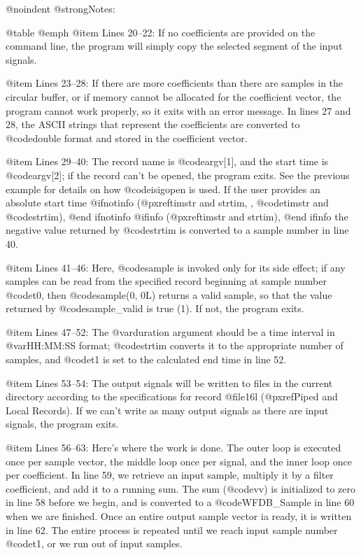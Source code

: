 {{{{{{{{{{{{{{@noindent
@strong{Notes:}

@table @emph
@item Lines 20--22:
If no coefficients are provided on the command line, the program will
simply copy the selected segment of the input signals.

@item Lines 23--28:
If there are more coefficients than there are samples in the circular
buffer, or if memory cannot be allocated for the coefficient vector, the
program cannot work properly, so it exits with an error message.  In
lines 27 and 28, the ASCII strings that represent the coefficients are
converted to @code{double} format and stored in the coefficient
vector.

@item Lines 29--40:
The record name is @code{argv[1]}, and the start time is @code{argv[2]};
if the record can't be opened, the program exits.  See the previous example
for details on how @code{isigopen} is used. If the user provides an absolute
start time
@ifnotinfo
(@pxref{timstr and strtim, , @code{timstr} and @code{strtim}}),
@end ifnotinfo
@ifinfo
(@pxref{timstr and strtim}),
@end ifinfo
the negative value returned by @code{strtim} is converted to a sample number
in line 40.

@item Lines 41--46:
Here, @code{sample} is invoked only for its side effect;  if any samples can
be read from the specified record beginning at sample number @code{t0}, then
@code{sample(0, 0L)} returns a valid sample, so that the value returned by
@code{sample_valid} is true (1).  If not, the program exits.

@item Lines 47--52:
The @var{duration} argument should be a time interval in @var{HH:MM:SS}
format; @code{strtim} converts it to the appropriate number of
samples, and @code{t1} is set to the calculated end time in line 52.

@item Lines 53--54:
The output signals will be written to files in the current directory
according to the specifications for record @file{16l}
(@pxref{Piped and Local Records}).  If we can't write as many output
signals as there are input signals, the program exits.

@item Lines 56--63:
Here's where the work is done.  The outer loop is executed once per
sample vector, the middle loop once per signal, and the inner loop
once per coefficient.  In line 59, we retrieve an input sample,
multiply it by a filter coefficient, and add it to a running sum.
The sum (@code{vv}) is initialized to zero in line 58 before we begin, and is
converted to a @code{WFDB_Sample} in line 60 when we are finished.  Once
an entire output sample vector ia ready, it is written in line 62.
The entire process is repeated until we reach input sample number @code{t1},
or we run out of input samples.

}}}}}}}}}}}}}}
